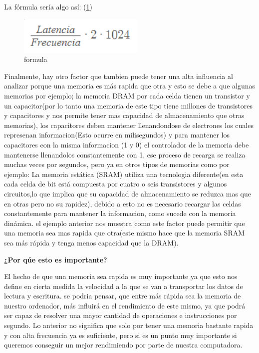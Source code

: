 \documentclass{article}
\begin{document}
La fórmula sería algo así: (\ref{fig:formula})
\begin{figure}[h]
\includegraphics[width=6cm]{formula.PNG}
\centering
\caption{formula}
\label{fig:formula}
\end{figure}

\noindent
Finalmente, hay otro factor que tambien puede tener una alta influencia al analizar porque una memoria es más rapida que otra y esto se debe a que algunas memorias por ejemplo; la memoria DRAM por cada celda tienen un transistor y un capacitor(por lo tanto una memoria de este tipo tiene millones de transistores y capacitores y nos permite tener mas capacidad de almacenamiento que otras memorias), los capacitores deben mantener llenandondose de electrones los cuales represenan informacion(Esto ocurre en milisegundos) y para mantener los capacitores con la misma informacion (1 y 0) el controlador de la memoria debe mantenerse llenandolos constantemente con 1, ese proceso de recarga se realiza muchas veces por segundos, pero ya en otros tipos de memorias como por ejemplo: La memoria estática (SRAM) utiliza una tecnologia diferente(en esta cada celda de bit está compuesta por cuatro o seis transistores y algunos circuitos,lo que implica que su capacidad de almacenamiento se reduzca mas que en otras pero no su rapidez), debido a esto no es necesario recargar las celdas constantemente para mantener la informacion, como sucede con la memoria dinámica. el ejemplo anterior nos muestra como este factor puede permitir que una memoria sea mas rapida que otra(este mismo hace que la memoria SRAM sea más rápida y tenga menos capacidad que la DRAM).\cite{Augusto}

\vspace{0.3cm}
\noindent
\textbf{¿Por qúe esto es importante?}

\vspace{}
\noindent
El hecho de que una memoria sea rapida es muy importante ya que esto nos define en cierta medida la velocidad a la que se van a transportar los datos de lectura y escritura. se podria pensar, que entre más rápida sea la memoria de nuestro ordenador, más influirá en el rendimiento de este mismo, ya que podrá ser capaz de resolver una mayor cantidad de operaciones e instrucciones por segundo.
\noindent
Lo anterior no significa que solo por tener una memoria bastante rapida y con alta frecuencia ya es suficiente, pero si es un punto muy importante si queremos conseguir un mejor rendimiendo por parte de nuestra computadora. \cite{computerhoy}
\end{document}

